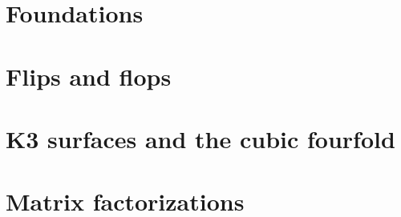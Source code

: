 \section{Foundations}

\newpage

\section{Flips and flops}

\newpage

\section{K3 surfaces and the cubic fourfold}

\newpage

\section{Matrix factorizations}

\newpage
